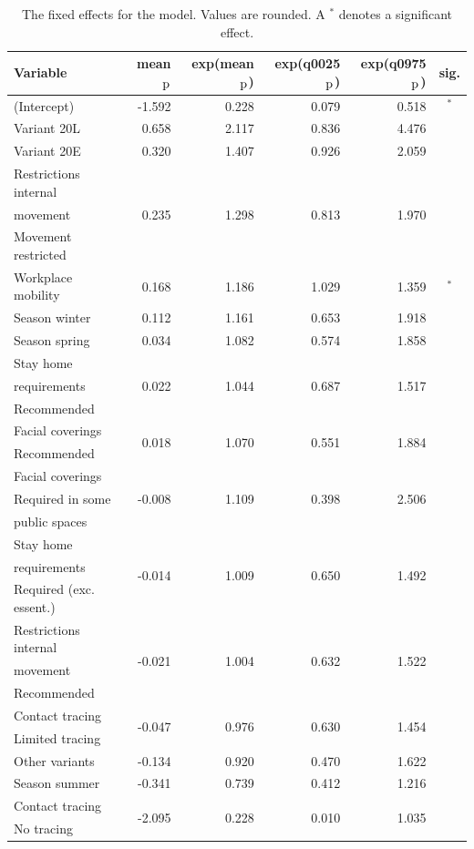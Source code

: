 \begin{table}[H]
\caption{The fixed effects for the model. Values are rounded. A $^*$ denotes a significant effect. \label{fixed_germany_temporal}}
\begin{tabular}{l r r r r c}
\toprule
\textbf{Variable}	& \textbf{mean$_{\hbox{p}}$}	& \textbf{exp(mean$_{\hbox{p}}$)} & \textbf{exp(q0025$_{\hbox{p}}$)} & \textbf{exp(q0975$_{\hbox{p}}$)} & \textbf{sig.}\\
\midrule
(Intercept) & -1.592 & 0.228 & 0.079 & 0.518 & $^*$ \\
Variant 20L & 0.658 & 2.117 & 0.836 & 4.476 \\
Variant 20E & 0.320 & 1.407 & 0.926 & 2.059 \\
Restrictions internal & \multirow{3}{*}{0.235} & \multirow{3}{*}{1.298} & \multirow{3}{*}{0.813} & \multirow{3}{*}{1.970} \\
movement \\
Movement restricted \\
Workplace mobility & 0.168 & 1.186 & 1.029 & 1.359 & $^*$\\
Season winter & 0.112 & 1.161 & 0.653 & 1.918 \\
Season spring & 0.034 & 1.082 & 0.574 & 1.858 \\
Stay home & \multirow{3}{*}{0.022} & \multirow{3}{*}{1.044} & \multirow{3}{*}{0.687} & \multirow{3}{*}{1.517} \\
requirements \\
Recommended \\
Facial coverings & \multirow{2}{*}{0.018} & \multirow{2}{*}{1.070} & \multirow{2}{*}{0.551} & \multirow{2}{*}{1.884} \\
Recommended \\
Facial coverings & \multirow{3}{*}{-0.008} & \multirow{3}{*}{1.109} & \multirow{3}{*}{0.398} & \multirow{3}{*}{2.506} \\
Required in some \\ 
public spaces \\
Stay home & \multirow{3}{*}{-0.014} & \multirow{3}{*}{1.009} & \multirow{3}{*}{0.650} & \multirow{3}{*}{1.492}\\
requirements \\
Required (exc. essent.) \\
Restrictions internal & \multirow{3}{*}{-0.021} & \multirow{3}{*}{1.004} & \multirow{3}{*}{0.632}& \multirow{3}{*}{1.522} \\
movement \\
Recommended \\
Contact tracing & \multirow{2}{*}{-0.047} & \multirow{2}{*}{0.976} & \multirow{2}{*}{0.630} & \multirow{2}{*}{1.454} \\
Limited tracing \\
Other variants & -0.134 & 0.920 & 0.470 & 1.622 \\
Season summer & -0.341 & 0.739 & 0.412 & 1.216 \\
Contact tracing & \multirow{2}{*}{-2.095} & \multirow{2}{*}{0.228} & \multirow{2}{*}{0.010} & \multirow{2}{*}{1.035} \\
No tracing \\
\bottomrule
\end{tabular}
\end{table}
